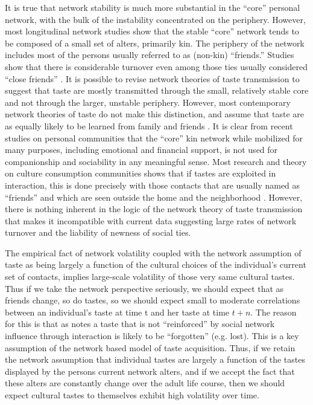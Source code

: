 It is true that network stability is much more substantial in the ``core'' personal network, with the bulk of the instability concentrated on the periphery\citep{bidart_lavenu05, suitor_etal97, wellman_etal97}.  However, most longitudinal network studies show that the stable ``core'' network tends to be composed of a small set of alters, primarily kin.  The periphery of the network includes most of the persons usually referred to as (non-kin) ``friends.''  Studies show that there is considerable turnover even among those ties usually considered ``close friends'' \citep{bidart_lavenu05}. It is possible to revise network theories of taste transmission to suggest that taste are mostly transmitted through the small, relatively stable core and not through the larger, unstable periphery.  However, most contemporary network theories of taste do not make this distinction, and assume that taste are as equally likely to be learned from family and friends \citep{mark03}.  It is clear from recent studies on personal communities that the ``core'' kin network while mobilized for many purposes, including emotional and financial support, is not used for companionship and sociability \citep{simmel49} in any meaningful sense.  Most research and theory on culture consumption communities shows that if tastes are exploited in interaction, this is done precisely with those contacts that are usually named as ``friends'' and which are seen outside the home and the neighborhood \citep{dimaggio87, fiske87, frith98}.  However, there is nothing inherent in the logic of the network theory of taste transmission that makes it incompatible with current data suggesting large rates of network turnover and the liability of newness of social ties.  

The empirical fact of network volatility coupled with the network assumption of taste as being largely a function of the cultural choices of the individual's current set of contacts, implies large-scale volatility of those very same cultural tastes.  Thus if we take the network perspective seriously, we should expect that as friends change, so do tastes, so we should expect small to moderate correlations between an individual's taste at time t and her taste at time $t+n$. The reason for this is that as \citet{mark03} notes a taste that is not ``reinforced'' by social network influence through interaction is likely to be ``forgotten'' (e.g. lost).   This is a key assumption of the network based model of taste acquisition.  Thus, if we retain the network assumption that individual tastes are largely a function of the tastes displayed by the persons current network alters, and if we accept the fact that these alters are constantly change over the adult life course, then we should expect cultural tastes to themselves exhibit high volatility over time.